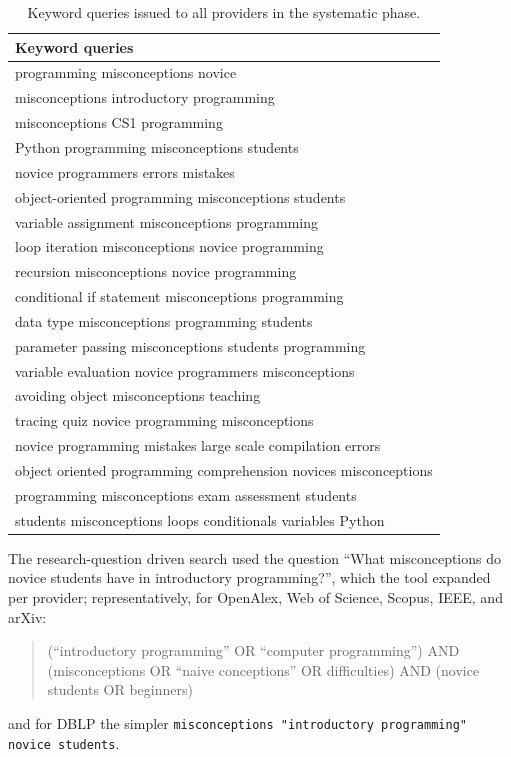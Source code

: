 \begin{table}[h]
  \centering
  \small
  \begin{tabular}{p{}}
    \toprule
    Keyword queries \\
    \midrule
    programming misconceptions novice \\
    misconceptions introductory programming \\
    misconceptions CS1 programming \\
    Python programming misconceptions students \\
    novice programmers errors mistakes \\
    object-oriented programming misconceptions students \\
    variable assignment misconceptions programming \\
    loop iteration misconceptions novice programming \\
    recursion misconceptions novice programming \\
    conditional if statement misconceptions programming \\
    data type misconceptions programming students \\
    parameter passing misconceptions students programming \\
    variable evaluation novice programmers misconceptions \\
    avoiding object misconceptions teaching \\
    tracing quiz novice programming misconceptions \\
    novice programming mistakes large scale compilation errors \\
    object oriented programming comprehension novices misconceptions \\
    programming misconceptions exam assessment students \\
    students misconceptions loops conditionals variables Python \\
    \bottomrule
  \end{tabular}
  \caption{Keyword queries issued to all providers in the systematic phase.}
  \label{tab:litqueries}
\end{table}

The research-question driven search used the question \enquote{What
misconceptions do novice students have in introductory programming?}, which the
tool expanded per provider; representatively, for OpenAlex, Web of Science,
Scopus, IEEE, and arXiv:
\begin{quote}\small
  (\enquote{introductory programming} OR \enquote{computer programming}) AND
  (misconceptions OR \enquote{naive conceptions} OR difficulties) AND
  (novice students OR beginners)
\end{quote}
and for DBLP the simpler \texttt{misconceptions "introductory programming"
novice students}.

